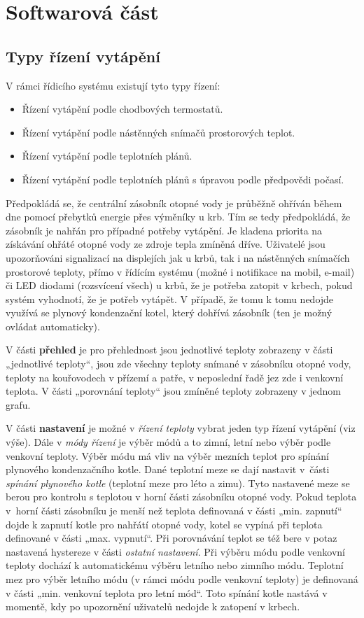 \section{Softwarová část}

\subsection{Typy řízení vytápění}
V rámci řídicího systému existují tyto typy řízení:

\begin{itemize}
  \item Řízení vytápění podle chodbových termostatů.
  \item Řízení vytápění podle nástěnných snímačů prostorových teplot.
  \item Řízení vytápění podle teplotních plánů.
  \item Řízení vytápění podle teplotních plánů s úpravou podle předpovědi počasí.
\end{itemize}

Předpokládá se, že centrální zásobník otopné vody je průběžně ohříván během dne pomocí přebytků energie přes výměníky u krb. Tím se tedy předpokládá, že zásobník je nahřán pro případné potřeby vytápění. Je kladena priorita na získávání ohřáté otopné vody ze zdroje tepla zmíněná dříve. Uživatelé jsou upozorňováni signalizací na displejích jak u krbů, tak i na nástěnných snímačích prostorové teploty, přímo v řídícím systému (možné i notifikace na mobil, e-mail) či LED diodami (rozsvícení všech) u krbů, že je potřeba zatopit v krbech, pokud systém vyhodnotí, že je potřeb vytápět. V případě, že tomu k tomu nedojde využívá se plynový kondenzační kotel, který dohřívá zásobník (ten je možný ovládat automaticky).

V části \textbf{přehled} je pro přehlednost jsou jednotlivé teploty zobrazeny v části „jednotlivé teploty“, jsou zde všechny teploty snímané v zásobníku otopné vody, teploty na kouřovodech v přízemí a patře, v neposlední řadě jez zde i venkovní teplota. V části „porovnání teploty“ jsou zmíněné teploty zobrazeny v jednom grafu.

V části \textbf{nastavení} je možné v \textit{řízení teploty} vybrat jeden typ řízení vytápění (viz výše). Dále v \textit{módy řízení} je výběr módů a to zimní, letní nebo výběr podle venkovní teploty. Výběr módu má vliv na výběr mezních teplot pro spínání plynového kondenzačního kotle. Dané teplotní meze se dají nastavit v~části \textit{spínání plynového kotle} (teplotní meze pro léto a zimu). Tyto nastavené meze se berou pro kontrolu s teplotou v horní části zásobníku otopné vody. Pokud teplota v~horní části zásobníku je menší než teplota definovaná v části „min. zapnutí“ dojde k zapnutí kotle pro nahřátí otopné vody, kotel se vypíná při teplota definované v části „max. vypnutí“. Při porovnávání teplot se též bere v potaz nastavená hystereze v části \textit{ostatní nastavení}. Při výběru módu podle venkovní teploty dochází k automatickému výběru letního nebo zimního módu. Teplotní mez pro výběr letního módu (v rámci módu podle venkovní teploty) je definovaná v části „min. venkovní teplota pro letní mód“. Toto spínání kotle nastává v momentě, kdy po upozornění uživatelů nedojde k zatopení v krbech.


